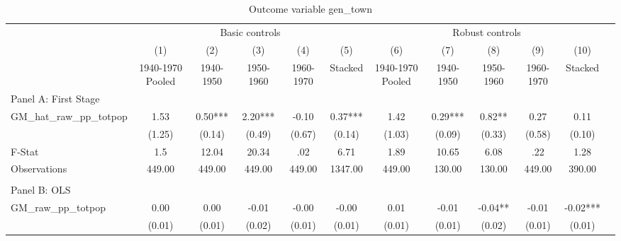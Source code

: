  \begin{table}[htbp]\centering {} \begin{threeparttable} \caption{Outcome variable gen\_town } \begin{tabular}{l*{11}{c}} \toprule
          &\multicolumn{5}{c}{Basic controls}                                   &\multicolumn{5}{c}{Robust controls}                                  \\\cmidrule(lr){2-6}\cmidrule(lr){7-11}
          &\multicolumn{1}{c}{(1)}&\multicolumn{1}{c}{(2)}&\multicolumn{1}{c}{(3)}&\multicolumn{1}{c}{(4)}&\multicolumn{1}{c}{(5)}&\multicolumn{1}{c}{(6)}&\multicolumn{1}{c}{(7)}&\multicolumn{1}{c}{(8)}&\multicolumn{1}{c}{(9)}&\multicolumn{1}{c}{(10)}\\
          &\multicolumn{1}{c}{1940-1970 Pooled}&\multicolumn{1}{c}{1940-1950}&\multicolumn{1}{c}{1950-1960}&\multicolumn{1}{c}{1960-1970}&\multicolumn{1}{c}{Stacked}&\multicolumn{1}{c}{1940-1970 Pooled}&\multicolumn{1}{c}{1940-1950}&\multicolumn{1}{c}{1950-1960}&\multicolumn{1}{c}{1960-1970}&\multicolumn{1}{c}{Stacked}\\
\cmidrule(lr){1-11}
\multicolumn{10}{l}{Panel A: First Stage}\\
\cmidrule(lr){1-11}
GM\_hat\_raw\_pp\_totpop&      1.53   &      0.50***&      2.20***&     -0.10   &      0.37***&      1.42   &      0.29***&      0.82** &      0.27   &      0.11   \\
          &    (1.25)   &    (0.14)   &    (0.49)   &    (0.67)   &    (0.14)   &    (1.03)   &    (0.09)   &    (0.33)   &    (0.58)   &    (0.10)   \\
\midrule
F-Stat    &       1.5   &     12.04   &     20.34   &       .02   &      6.71   &      1.89   &     10.65   &      6.08   &       .22   &      1.28   \\
Observations&    449.00   &    449.00   &    449.00   &    449.00   &   1347.00   &    449.00   &    130.00   &    130.00   &    449.00   &    390.00   \\
\cmidrule[\heavyrulewidth](lr){1-11} \\ \cmidrule[\heavyrulewidth](lr){1-11}
\multicolumn{10}{l}{Panel B: OLS}\\
\cmidrule(lr){1-11}
GM\_raw\_pp\_totpop&      0.00   &      0.00   &     -0.01   &     -0.00   &     -0.00   &      0.01   &     -0.01   &     -0.04** &     -0.01   &     -0.02***\\
          &    (0.01)   &    (0.01)   &    (0.02)   &    (0.01)   &    (0.01)   &    (0.01)   &    (0.01)   &    (0.02)   &    (0.01)   &    (0.01)   \\

\end{tabular}
\end{threeparttable}
\end{table}
